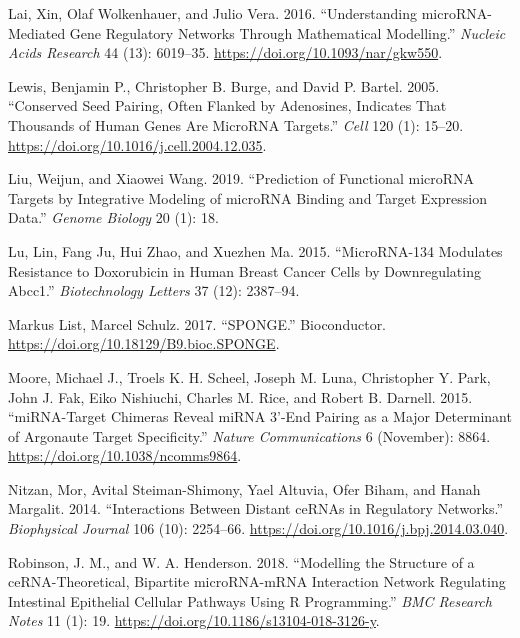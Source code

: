 \documentclass[]{article}
\begin{document}
\leavevmode\hypertarget{ref-lai_understanding_2016}{}%
Lai, Xin, Olaf Wolkenhauer, and Julio Vera. 2016. ``Understanding
microRNA-Mediated Gene Regulatory Networks Through Mathematical
Modelling.'' \emph{Nucleic Acids Research} 44 (13): 6019--35.
\url{https://doi.org/10.1093/nar/gkw550}.

\leavevmode\hypertarget{ref-lewis_conserved_2005}{}%
Lewis, Benjamin P., Christopher B. Burge, and David P. Bartel. 2005.
``Conserved Seed Pairing, Often Flanked by Adenosines, Indicates That
Thousands of Human Genes Are MicroRNA Targets.'' \emph{Cell} 120 (1):
15--20. \url{https://doi.org/10.1016/j.cell.2004.12.035}.

\leavevmode\hypertarget{ref-liu2019prediction}{}%
Liu, Weijun, and Xiaowei Wang. 2019. ``Prediction of Functional microRNA
Targets by Integrative Modeling of microRNA Binding and Target
Expression Data.'' \emph{Genome Biology} 20 (1): 18.

\leavevmode\hypertarget{ref-lu2015microrna}{}%
Lu, Lin, Fang Ju, Hui Zhao, and Xuezhen Ma. 2015. ``MicroRNA-134
Modulates Resistance to Doxorubicin in Human Breast Cancer Cells by
Downregulating Abcc1.'' \emph{Biotechnology Letters} 37 (12): 2387--94.

\leavevmode\hypertarget{ref-markus_list_sponge_2017}{}%
Markus List, Marcel Schulz. 2017. ``SPONGE.'' Bioconductor.
\url{https://doi.org/10.18129/B9.bioc.SPONGE}.

\leavevmode\hypertarget{ref-moore_mirnatarget_2015}{}%
Moore, Michael J., Troels K. H. Scheel, Joseph M. Luna, Christopher Y.
Park, John J. Fak, Eiko Nishiuchi, Charles M. Rice, and Robert B.
Darnell. 2015. ``miRNA-Target Chimeras Reveal miRNA 3'-End Pairing as a
Major Determinant of Argonaute Target Specificity.'' \emph{Nature
Communications} 6 (November): 8864.
\url{https://doi.org/10.1038/ncomms9864}.

\leavevmode\hypertarget{ref-nitzan_interactions_2014}{}%
Nitzan, Mor, Avital Steiman-Shimony, Yael Altuvia, Ofer Biham, and Hanah
Margalit. 2014. ``Interactions Between Distant ceRNAs in Regulatory
Networks.'' \emph{Biophysical Journal} 106 (10): 2254--66.
\url{https://doi.org/10.1016/j.bpj.2014.03.040}.

\leavevmode\hypertarget{ref-robinson_modelling_2018}{}%
Robinson, J. M., and W. A. Henderson. 2018. ``Modelling the Structure of
a ceRNA-Theoretical, Bipartite microRNA-mRNA Interaction Network
Regulating Intestinal Epithelial Cellular Pathways Using R
Programming.'' \emph{BMC Research Notes} 11 (1): 19.
\url{https://doi.org/10.1186/s13104-018-3126-y}.
\end{document}
